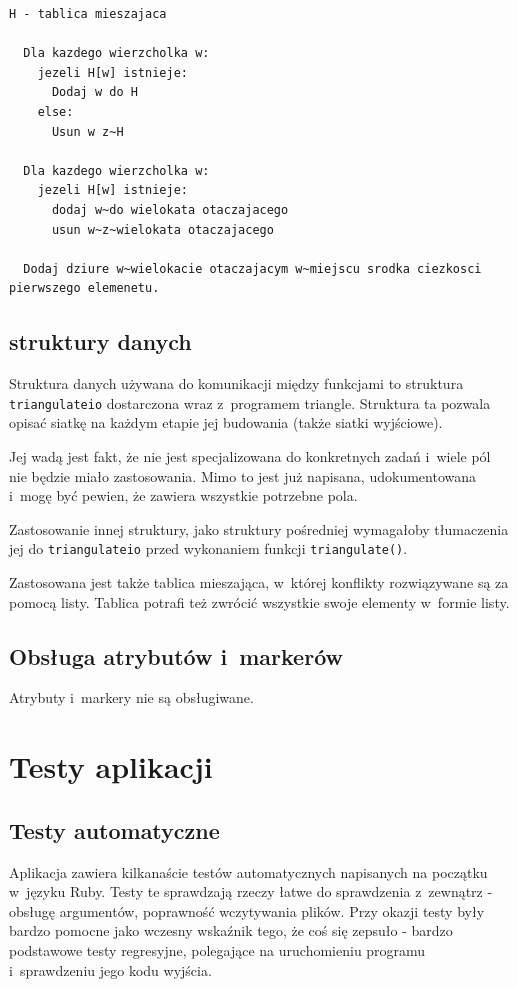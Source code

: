 \documentclass[a4paper]{article} \usepackage{setspace}
\begin{document}
\begin{lstlisting}[caption=Pseudokod funkcji szukającej wielokąta otaczającego daną siatkę: \texttt{bounding\_polygon}]
  H - tablica mieszajaca

  Dla kazdego wierzcholka w:
    jezeli H[w] istnieje:
      Dodaj w do H
    else:
      Usun w z~H

  Dla kazdego wierzcholka w:
    jezeli H[w] istnieje:
      dodaj w~do wielokata otaczajacego
      usun w~z~wielokata otaczajacego

  Dodaj dziure w~wielokacie otaczajacym w~miejscu srodka ciezkosci pierwszego elemenetu.

\end{lstlisting}

\subsection{struktury danych}
Struktura danych używana do komunikacji między funkcjami to struktura \texttt{triangulateio} dostarczona wraz z~programem triangle.
Struktura ta pozwala opisać siatkę na każdym etapie jej budowania (także siatki wyjściowe).

Jej wadą jest fakt, że nie jest specjalizowana do konkretnych zadań i~wiele pól nie będzie miało zastosowania.
Mimo to jest już napisana, udokumentowana i~mogę być pewien, że zawiera wszystkie potrzebne pola.

Zastosowanie innej struktury, jako struktury pośredniej wymagałoby tłumaczenia jej do \texttt{triangulateio} przed wykonaniem funkcji \texttt{triangulate()}.

Zastosowana jest także tablica mieszająca, w~której konflikty rozwiązywane są za pomocą listy.
Tablica potrafi też zwrócić wszystkie swoje elementy w~formie listy.

\subsection{Obsługa atrybutów i~markerów}
Atrybuty i~markery nie są obsługiwane.

\section{Testy aplikacji}
\subsection{Testy automatyczne}
Aplikacja zawiera kilkanaście testów automatycznych napisanych na początku w~języku Ruby.
Testy te sprawdzają rzeczy łatwe do sprawdzenia z~zewnątrz - obsługę argumentów, poprawność wczytywania plików.
Przy okazji testy były bardzo pomocne jako wczesny wskaźnik tego, że coś się zepsuło - bardzo podstawowe testy regresyjne, polegające na uruchomieniu programu i~sprawdzeniu jego kodu wyjścia.
\end{document}
